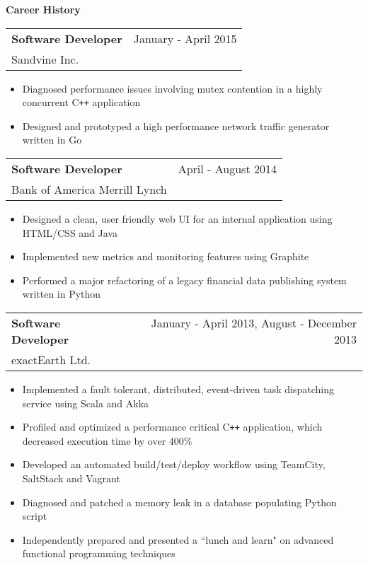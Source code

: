 \documentclass[10pt]{article}
\makeatletter
\newcommand{\resheading}[1]{{\large \colorbox{headercol}{\begin{minipage}{\textwidth}{\textbf{#1 \vphantom{p\^{E}}}}\end{minipage}}}}
\newcommand{\ressubheading}[3]{\item
\begin{tabular*}{7in}{l@{\extracolsep{\fill}}r}
    \textbf{#1} & #2 \\ #3
\end{tabular*}\vspace{-4pt}}
\makeatother
\begin{document}
\resheading{Career History}
\begin{description}
    \ressubheading{Software Developer} {January - April 2015} {Sandvine Inc.}
    \begin{itemize}
        \item{Diagnosed performance issues involving mutex contention in a highly concurrent C\texttt{++} application}
        \item{Designed and prototyped a high performance network traffic generator written in Go}
    \end{itemize}

    \ressubheading{Software Developer} {April - August 2014} {Bank of America Merrill Lynch}
    \begin{itemize}
        \item{Designed a clean, user friendly web UI for an internal application using HTML/CSS and Java}
        \item{Implemented new metrics and monitoring features using Graphite}
        \item{Performed a major refactoring of a legacy financial data publishing system written in Python}
    \end{itemize}

    \ressubheading{Software Developer} {January - April 2013, August - December 2013} {exactEarth Ltd.}
    \begin{itemize}
        \item{Implemented a fault tolerant, distributed, event-driven task dispatching service using Scala and Akka}
        \item{Profiled and optimized a performance critical C\texttt{++} application, which decreased execution time by over 400\%}
        \item{Developed an automated build/test/deploy workflow using TeamCity, SaltStack and Vagrant}
        \item{Diagnosed and patched a memory leak in a database populating Python script}
        \item{Independently prepared and presented a ``lunch and learn" on advanced functional programming techniques}
    \end{itemize}


\end{description}
\end{document}

